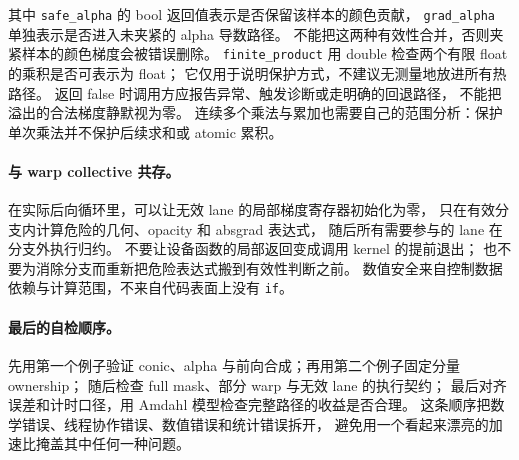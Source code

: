 其中 \texttt{safe\_alpha} 的 bool 返回值表示是否保留该样本的颜色贡献，
\texttt{grad\_alpha} 单独表示是否进入未夹紧的 alpha 导数路径。
不能把这两种有效性合并，否则夹紧样本的颜色梯度会被错误删除。
\texttt{finite\_product} 用 double 检查两个有限 float 的乘积是否可表示为 float；
它仅用于说明保护方式，不建议无测量地放进所有热路径。
返回 false 时调用方应报告异常、触发诊断或走明确的回退路径，
不能把溢出的合法梯度静默视为零。
连续多个乘法与累加也需要自己的范围分析：保护单次乘法并不保护后续求和或 atomic 累积。

\paragraph{与 warp collective 共存。}
在实际后向循环里，可以让无效 lane 的局部梯度寄存器初始化为零，
只在有效分支内计算危险的几何、opacity 和 absgrad 表达式，
随后所有需要参与的 lane 在分支外执行归约。
不要让设备函数的局部返回变成调用 kernel 的提前退出；
也不要为消除分支而重新把危险表达式搬到有效性判断之前。
数值安全来自控制数据依赖与计算范围，不来自代码表面上没有 \texttt{if}。

\paragraph{最后的自检顺序。}
先用第一个例子验证 conic、alpha 与前向合成；再用第二个例子固定分量 ownership；
随后检查 full mask、部分 warp 与无效 lane 的执行契约；
最后对齐误差和计时口径，用 Amdahl 模型检查完整路径的收益是否合理。
这条顺序把数学错误、线程协作错误、数值错误和统计错误拆开，
避免用一个看起来漂亮的加速比掩盖其中任何一种问题。
